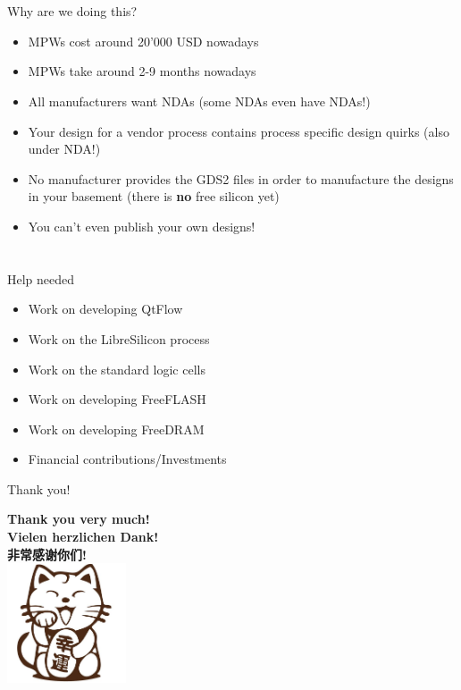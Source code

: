 \documentclass[9pt]{beamer}
\begin{document}
\section[Why]{}
\begin{frame}{Why are we doing this?}
	\begin{itemize}
		\item MPWs cost around 20'000 USD nowadays
		\item MPWs take around 2-9 months nowadays
		\item All manufacturers want NDAs (some NDAs even have NDAs!)
		\item Your design for a vendor process contains process specific design quirks (also under NDA!)
		\item No manufacturer provides the GDS2 files in order to manufacture the designs in your basement (there is \textbf{no} free silicon yet)
		\item You can't even publish your own designs!
	\end{itemize}
\end{frame}

\section[Conclusion]{}

\begin{frame}{Help needed}
	\begin{itemize}
		\item Work on developing QtFlow\footnotemark
		\item Work on the LibreSilicon process\footnotemark
		\item Work on the standard logic cells
		\item Work on developing FreeFLASH
		\item Work on developing FreeDRAM
		\item Financial contributions/Investments
	\end{itemize}

\end{frame}

\begin{frame}{Thank you!}
	\begin{center}
		\textbf{Thank you very much!} \\
		\textbf{Vielen herzlichen Dank!} \\
		\textbf{\cjkfont 非常感谢你们!} \\
		\includegraphics[width=100pt]{cat.png}
	\end{center}
\end{frame}
\end{document}
